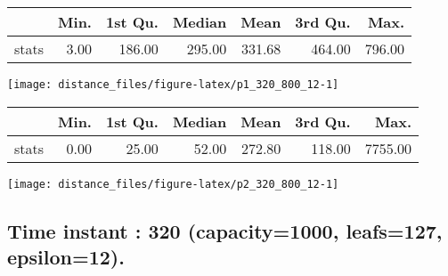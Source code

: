 \documentclass[
  9pt,
  landscape]{article}
\begin{document}
\begin{minipage}{0.5\textwidth} 
\centering 
\begin{tabular}{rrrrrrr}
  \hline
 & Min. & 1st Qu. & Median & Mean & 3rd Qu. & Max. \\ 
  \hline
stats & 3.00 & 186.00 & 295.00 & 331.68 & 464.00 & 796.00 \\ 
   \hline
\end{tabular}
\vspace{0.5cm} 


\texttt{[image: distance\_files/figure-latex/p1\_320\_800\_12-1]} 

\end{minipage} 
\begin{minipage}{0.5\textwidth} 
\centering 
\begin{tabular}{rrrrrrr}
  \hline
 & Min. & 1st Qu. & Median & Mean & 3rd Qu. & Max. \\ 
  \hline
stats & 0.00 & 25.00 & 52.00 & 272.80 & 118.00 & 7755.00 \\ 
   \hline
\end{tabular}
\vspace{0.5cm} 


\texttt{[image: distance\_files/figure-latex/p2\_320\_800\_12-1]} 

\end{minipage}

\pagebreak

\hypertarget{time-instant-320-capacity1000-leafs127-epsilon12.}{%
\subsection{Time instant : 320 (capacity=1000, leafs=127,
epsilon=12).}\label{time-instant-320-capacity1000-leafs127-epsilon12.}}
\end{document}
